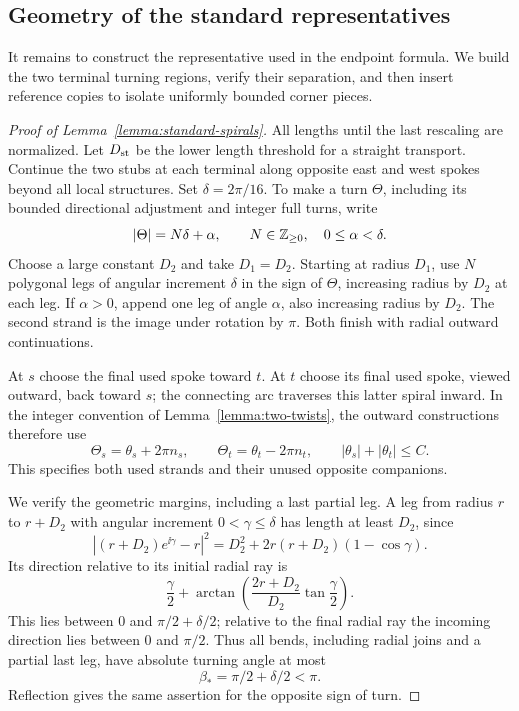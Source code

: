 \subsection{Geometry of the standard representatives}

It remains to construct the representative used in the endpoint formula.
We build the two terminal turning regions, verify their separation, and
then insert reference copies to isolate uniformly bounded corner pieces.

\begin{proof}[Proof of Lemma~\ref{lemma:standard-spirals}]
All lengths until the last rescaling are normalized.  Let $D_{\rm st}$
be the lower length threshold for a straight transport.  Continue the
two stubs at each terminal along opposite east and west spokes beyond
all local structures.  Set $\delta=2\pi/16$.  To make a turn $\Theta$,
including its bounded directional adjustment and integer full turns,
write
\[
 |\Theta|=N\delta+\alpha,\qquad
 N\in\mathbb Z_{\ge0},\quad 0\le\alpha<\delta.
\]
Choose a large constant $D_2$ and take $D_1=D_2$.  Starting at radius
$D_1$, use $N$ polygonal legs of angular increment $\delta$ in the sign
of $\Theta$, increasing radius by $D_2$ at each leg.  If $\alpha>0$,
append one leg of angle $\alpha$, also increasing radius by $D_2$.
The second strand is the image under rotation by $\pi$.  Both finish
with radial outward continuations.

At $s$ choose the final used spoke toward $t$.  At $t$ choose its final
used spoke, viewed outward, back toward $s$; the connecting arc traverses
this latter spiral inward.  In the integer convention of
Lemma~\ref{lemma:two-twists}, the outward constructions therefore use
\[
 \Theta_s=\theta_s+2\pi n_s,\qquad
 \Theta_t=\theta_t-2\pi n_t,
 \qquad |\theta_s|+|\theta_t|\le C.
\]
This specifies both used strands and their unused opposite companions.

We verify the geometric margins, including a last partial leg.  A leg
from radius $r$ to $r+D_2$ with angular increment
$0<\gamma\le\delta$ has length at least $D_2$, since
\[
 |(r+D_2)e^{\ii\gamma}-r|^2
   =D_2^2+2r(r+D_2)(1-\cos\gamma).
\]
Its direction relative to its initial radial ray is
\[
 \frac\gamma2+\arctan\left(
      \frac{2r+D_2}{D_2}\tan\frac\gamma2\right).
\]
This lies between $0$ and $\pi/2+\delta/2$; relative to the final radial
ray the incoming direction lies between $0$ and $\pi/2$.  Thus all
bends, including radial joins and a partial last leg, have absolute
turning angle at most
\[
 \beta_* =\pi/2+\delta/2<\pi.
\]
Reflection gives the same assertion for the opposite sign of turn.


\end{proof}
